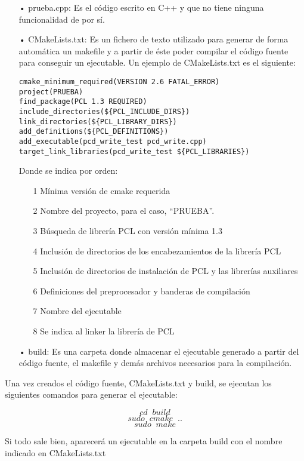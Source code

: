 \begin{itemize}
\item[•]prueba.cpp: Es el código escrito en C++ y que no tiene ninguna funcionalidad de por sí. 

\item[•]CMakeLists.txt: Es un fichero de texto utilizado para generar de forma automática un makefile y a partir de éste poder compilar el código fuente para conseguir un ejecutable. Un ejemplo de CMakeLists.txt es el siguiente:

\begin{lstlisting}
cmake_minimum_required(VERSION 2.6 FATAL_ERROR)	
project(PRUEBA)	
find_package(PCL 1.3 REQUIRED)	
include_directories(${PCL_INCLUDE_DIRS})	
link_directories(${PCL_LIBRARY_DIRS})	
add_definitions(${PCL_DEFINITIONS})	
add_executable(pcd_write_test pcd_write.cpp)	
target_link_libraries(pcd_write_test ${PCL_LIBRARIES})	
\end{lstlisting}

Donde se indica por orden: 

\begin{itemize}
\item[1]Mínima versión de cmake requerida
\item[2]Nombre del proyecto, para el caso, ``PRUEBA''.
\item[3]Búsqueda de librería PCL con versión mínima 1.3
\item[4]Inclusión de directorios de los encabezamientos de la librería PCL
\item[5]Inclusión de directorios de instalación de PCL y las librerías auxiliares
\item[6]Definiciones del preprocesador y banderas de compilación
\item[7]Nombre del ejecutable 
\item[8]Se indica al linker la librería de PCL
\end{itemize}

\item[•]build: Es una carpeta donde almacenar el ejecutable generado a partir del código fuente, el makefile y demás archivos necesarios para la compilación.
\end{itemize}

Una vez creados el código fuente, CMakeLists.txt y build, se ejecutan los siguientes comandos para generar el ejecutable:

$$cd \;\; build$$
$$sudo \;\; cmake \;\; ..$$
$$sudo \;\; make$$

Si todo sale bien, aparecerá un ejecutable en la carpeta build con el nombre indicado en CMakeLists.txt


